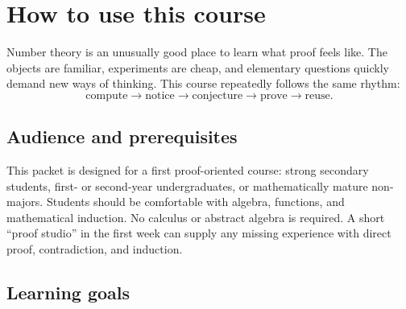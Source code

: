 \chapter*{How to use this course}

\begin{bigidea}
Number theory is an unusually good place to learn what proof feels like. The objects are familiar, experiments are cheap, and elementary questions quickly demand new ways of thinking. This course repeatedly follows the same rhythm:
\[
\text{compute} \longrightarrow \text{notice} \longrightarrow \text{conjecture} \longrightarrow \text{prove} \longrightarrow \text{reuse}.
\]
\end{bigidea}

\section*{Audience and prerequisites}

This packet is designed for a first proof-oriented course: strong secondary students, first- or second-year undergraduates, or mathematically mature non-majors. Students should be comfortable with algebra, functions, and mathematical induction. No calculus or abstract algebra is required. A short ``proof studio'' in the first week can supply any missing experience with direct proof, contradiction, and induction.

\section*{Learning goals}

